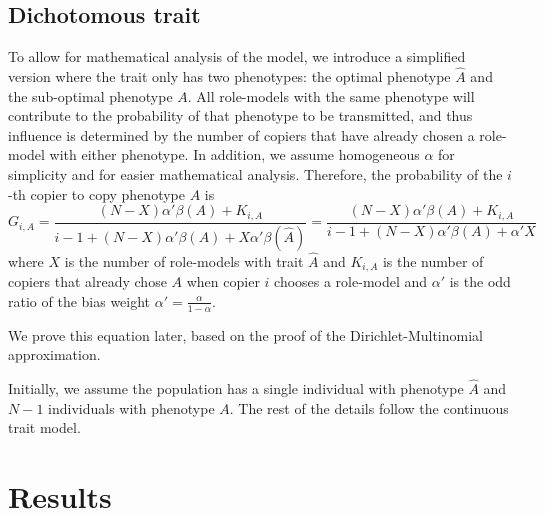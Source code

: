 \documentclass[12pt]{extarticle}
\begin{document}
\subsection{Dichotomous trait}
To allow for mathematical analysis of the model, we introduce a simplified version where the trait only has two phenotypes: the optimal phenotype $\hat{A}$ and the sub-optimal phenotype $A$. 
All role-models with the same phenotype will contribute to the probability of that phenotype to be transmitted, and thus influence is determined by the number of copiers that have already chosen a role-model with either phenotype.
In addition, we assume homogeneous $\alpha$ for simplicity and for easier mathematical analysis.
Therefore, the probability of the $i$-th copier to copy phenotype $A$ is
\begin{equation}\label{eq:binary-model}
G_{i,A} = \frac{(N-X)\alpha'\beta(A) + K_{i,A}}{i-1 + (N-X)\alpha'\beta(A) + X\alpha'\beta(\hat{A})} = \frac{(N-X)\alpha'\beta(A) + K_{i,A}}{i-1 + (N-X)\alpha'\beta(A) + \alpha'X}
\end{equation}
where $X$ is the number of role-models with trait $\hat{A}$ and $K_{i,A}$ is the number of copiers that already chose $A$ when copier $i$ chooses a role-model and $\alpha'$ is the odd ratio of the bias weight $\alpha'= \frac{\alpha}{1-\alpha}$.

We prove this equation later, based on the proof of the Dirichlet-Multinomial approximation.

Initially, we assume the population has a single individual with phenotype $\hat{A}$ and $N-1$ individuals with phenotype $A$. The rest of the details follow the continuous trait model.

\section{Results}
\end{document}
